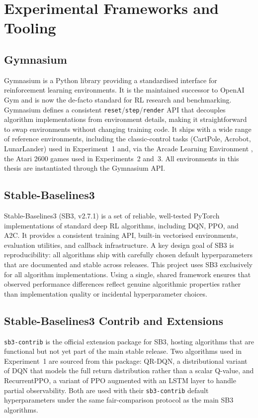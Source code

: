 {\color{red}
\section{Experimental Frameworks and Tooling}
\label{sec:tooling}

\subsection{Gymnasium}
\label{subsec:gymnasium}
Gymnasium \citep{towers2024gymnasium} is a Python library providing a standardised interface for reinforcement learning environments. It is the maintained successor to OpenAI Gym and is now the de-facto standard for RL research and benchmarking. Gymnasium defines a consistent \texttt{reset}/\texttt{step}/\texttt{render} API that decouples algorithm implementations from environment details, making it straightforward to swap environments without changing training code. It ships with a wide range of reference environments, including the classic-control tasks (CartPole, Acrobot, LunarLander) used in Experiment~1 and, via the Arcade Learning Environment \citep{bellemare2013ale}, the Atari 2600 games used in Experiments~2 and~3. All environments in this thesis are instantiated through the Gymnasium API.

\subsection{Stable-Baselines3}
\label{subsec:sb3}
Stable-Baselines3 (SB3, v2.7.1) \citep{raffin2021sb3} is a set of reliable, well-tested PyTorch implementations of standard deep RL algorithms, including DQN, PPO, and A2C. It provides a consistent training API, built-in vectorised environments, evaluation utilities, and callback infrastructure. A key design goal of SB3 is reproducibility: all algorithms ship with carefully chosen default hyperparameters that are documented and stable across releases. This project uses SB3 exclusively for all algorithm implementations. Using a single, shared framework ensures that observed performance differences reflect genuine algorithmic properties rather than implementation quality or incidental hyperparameter choices.

\subsection{Stable-Baselines3 Contrib and Extensions}
\label{subsec:sb3contrib}
\texttt{sb3-contrib} is the official extension package for SB3, hosting algorithms that are functional but not yet part of the main stable release. Two algorithms used in Experiment~1 are sourced from this package: QR-DQN, a distributional variant of DQN that models the full return distribution rather than a scalar Q-value, and RecurrentPPO, a variant of PPO augmented with an LSTM layer to handle partial observability. Both are used with their \texttt{sb3-contrib} default hyperparameters under the same fair-comparison protocol as the main SB3 algorithms.

}
